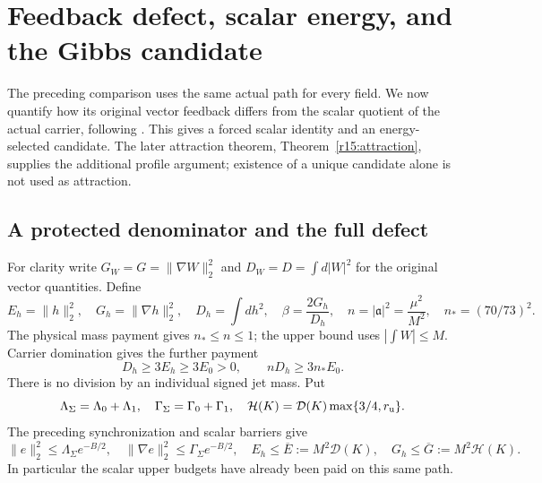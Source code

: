 \documentclass[11pt]{article}
\numberwithin{equation}{section}
\begin{document}
\section{Feedback defect, scalar energy, and the Gibbs candidate}
\label{sec:scalarcarrier}

The preceding comparison uses the same actual path for every field.
We now quantify how its original vector feedback differs from the
scalar quotient of the actual carrier, following \cite{CarrierDefectNote}.
This gives a forced scalar identity and an energy-selected candidate.
The later attraction theorem, Theorem~\ref{r15:attraction}, supplies the
additional profile argument; existence of a unique candidate alone is
not used as attraction.

\subsection{A protected denominator and the full defect}

For clarity write $G_W=G=\|\nabla W\|_2^2$ and
$D_W=D=\int d|W|^2$ for the original vector quantities. Define
\begin{equation}\label{r13:scalarquantities}
 E_h=\|h\|_2^2,\quad G_h=\|\nabla h\|_2^2,\quad
 D_h=\int dh^2,\quad \beta=\frac{2G_h}{D_h},\quad
 n=|\mathfrak a|^2=\frac{\mu^2}{M^2},\quad n_*=(70/73)^2.
\end{equation}
The physical mass payment gives $n_*\le n\le1$; the upper bound
uses $|\int W|\le M$. Carrier domination gives the further payment
\begin{equation}\label{r13:protecteddenominator}
 D_h\ge3E_h\ge3E_0>0,\qquad nD_h\ge3n_*E_0.
\end{equation}
There is no division by an individual signed jet mass. Put
\begin{equation}\label{r13:errorandscalarconstants}
 \Lambda_\Sigma=\Lambda_0+\Lambda_1,
 \quad\Gamma_\Sigma=\Gamma_0+\Gamma_1,
 \quad\mathcal H(K)=\mathcal D(K)\max\{3/4,r_{\rm u}\}.
\end{equation}
The preceding synchronization and scalar barriers give
\[
 \|e\|_2^2\le\Lambda_\Sigma e^{-B/2},\quad
 \|\nabla e\|_2^2\le\Gamma_\Sigma e^{-B/2},\quad
 E_h\le\overline E:=M^2\mathcal D(K),\quad
 G_h\le\overline G:=M^2\mathcal H(K).
\]
In particular the scalar upper budgets have already been paid on this
same path.
\end{document}

